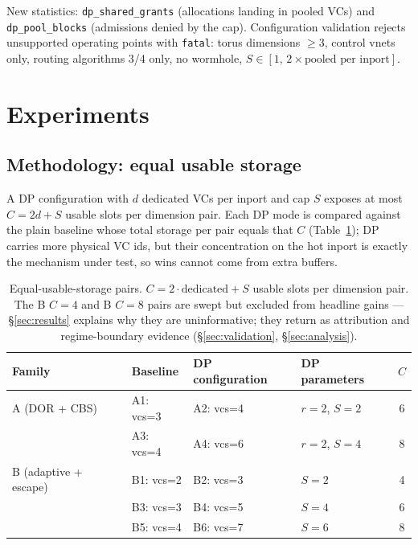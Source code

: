 \documentclass[10pt]{article}
\begin{document}
New statistics: \texttt{dp\_shared\_grants} (allocations landing in
pooled VCs) and \texttt{dp\_pool\_blocks} (admissions denied by the cap).
Configuration validation rejects unsupported operating points with
\texttt{fatal}: torus dimensions $\ge 3$, control vnets only, routing
algorithms 3/4 only, no wormhole, $S \in [1,\, 2\times\text{pooled per
inport}]$.

\section{Experiments}
\label{sec:experiments}

\subsection{Methodology: equal usable storage}

A DP configuration with $d$ dedicated VCs per inport and cap $S$ exposes
at most $C = 2d + S$ usable slots per dimension pair. Each DP mode is
compared against the plain baseline whose total storage per pair equals
that $C$ (Table~\ref{tab:configs}); DP carries more physical VC ids, but
their concentration on the hot inport is exactly the mechanism under
test, so wins cannot come from extra buffers.

\begin{table}[H]
\centering
\small
\begin{tabular}{llllc}
\toprule
Family & Baseline & DP configuration & DP parameters & $C$ \\
\midrule
A (DOR + CBS) & A1: vcs=3 & A2: vcs=4 & $r{=}2$, $S{=}2$ & 6 \\
              & A3: vcs=4 & A4: vcs=6 & $r{=}2$, $S{=}4$ & 8 \\
B (adaptive + escape) & B1: vcs=2 & B2: vcs=3 & $S{=}2$ & 4 \\
              & B3: vcs=3 & B4: vcs=5 & $S{=}4$ & 6 \\
              & B5: vcs=4 & B6: vcs=7 & $S{=}6$ & 8 \\
\bottomrule
\end{tabular}
\caption{Equal-usable-storage pairs. $C = 2\cdot\text{dedicated} + S$
usable slots per dimension pair. The B $C{=}4$ and B $C{=}8$ pairs are
swept but excluded from headline gains --- \S\ref{sec:results} explains
why they are uninformative; they return as attribution and
regime-boundary evidence (\S\ref{sec:validation},
\S\ref{sec:analysis}).}
\label{tab:configs}
\end{table}
\end{document}
